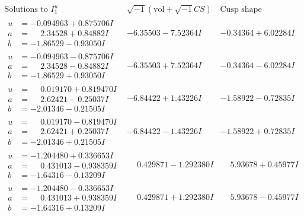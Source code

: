 \documentclass[1p]{elsarticle_modified}
\theoremstyle{definition}
\newcommand{\I}{\sqrt{-1}}
\begin{document}
$$\begin{array}{c|c|c}  
\text{Solutions to }I^u_{1}& \I (\text{vol} + \sqrt{-1}CS) & \text{Cusp shape}\\
 \hline 
\begin{aligned}
u &= -0.094963 + 0.875706 I \\
a &= \phantom{-}2.34528 + 0.84882 I \\
b &= -1.86529 - 0.93050 I\end{aligned}
 & -6.35503 - 7.52364 I & -0.34364 + 6.02284 I \\ \hline\begin{aligned}
u &= -0.094963 - 0.875706 I \\
a &= \phantom{-}2.34528 - 0.84882 I \\
b &= -1.86529 + 0.93050 I\end{aligned}
 & -6.35503 + 7.52364 I & -0.34364 - 6.02284 I \\ \hline\begin{aligned}
u &= \phantom{-}0.019170 + 0.819470 I \\
a &= \phantom{-}2.62421 - 0.25037 I \\
b &= -2.01346 - 0.21505 I\end{aligned}
 & -6.84422 + 1.43226 I & -1.58922 - 0.72835 I \\ \hline\begin{aligned}
u &= \phantom{-}0.019170 - 0.819470 I \\
a &= \phantom{-}2.62421 + 0.25037 I \\
b &= -2.01346 + 0.21505 I\end{aligned}
 & -6.84422 - 1.43226 I & -1.58922 + 0.72835 I \\ \hline\begin{aligned}
u &= -1.204480 + 0.336653 I \\
a &= \phantom{-}0.431013 - 0.938359 I \\
b &= -1.64316 - 0.13209 I\end{aligned}
 & \phantom{-}0.429871 - 1.292380 I & \phantom{-}5.93678 + 0.45977 I \\ \hline\begin{aligned}
u &= -1.204480 - 0.336653 I \\
a &= \phantom{-}0.431013 + 0.938359 I \\
b &= -1.64316 + 0.13209 I\end{aligned}
 & \phantom{-}0.429871 + 1.292380 I & \phantom{-}5.93678 - 0.45977 I \\ \hline\begin{aligned}

\end{aligned}
\end{array}$$
\end{document}
